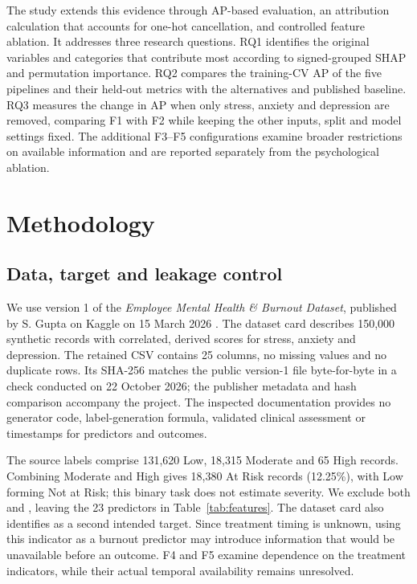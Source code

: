 \documentclass[runningheads]{llncs}
\begin{document}
The study extends this evidence through AP-based evaluation, an attribution calculation that accounts for one-hot cancellation, and controlled feature ablation. It addresses three research questions. RQ1 identifies the original variables and categories that contribute most according to signed-grouped SHAP and permutation importance. RQ2 compares the training-CV AP of the five pipelines and their held-out metrics with the alternatives and published baseline. RQ3 measures the change in AP when only stress, anxiety and depression are removed, comparing F1 with F2 while keeping the other inputs, split and model settings fixed. The additional F3--F5 configurations examine broader restrictions on available information and are reported separately from the psychological ablation.

\FloatBarrier
\section{Methodology}
\subsection{Data, target and leakage control}
We use version 1 of the \emph{Employee Mental Health \& Burnout Dataset}, published by S. Gupta on Kaggle on 15 March 2026 \cite{dataset}. The dataset card describes 150,000 synthetic records with correlated, derived scores for stress, anxiety and depression. The retained CSV contains 25 columns, no missing values and no duplicate rows. Its SHA-256 matches the public version-1 file byte-for-byte in a check conducted on 22 October 2026; the publisher metadata and hash comparison accompany the project. The inspected documentation provides no generator code, label-generation formula, validated clinical assessment or timestamps for predictors and outcomes.

The source labels comprise 131,620 Low, 18,315 Moderate and 65 High records. Combining Moderate and High gives 18,380 At Risk records (12.25\%), with Low forming Not at Risk; this binary task does not estimate severity. We exclude both  and , leaving the 23 predictors in Table~\ref{tab:features}. The dataset card also identifies  as a second intended target. Since treatment timing is unknown, using this indicator as a burnout predictor may introduce information that would be unavailable before an outcome. F4 and F5 examine dependence on the treatment indicators, while their actual temporal availability remains unresolved.
\end{document}
